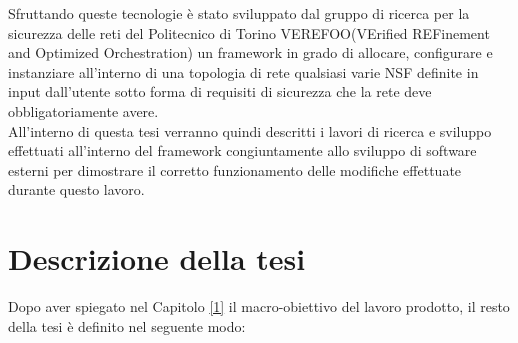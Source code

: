 Sfruttando queste tecnologie è stato sviluppato dal gruppo di ricerca per la sicurezza delle reti del Politecnico di Torino VEREFOO(VErified REFinement and Optimized Orchestration) 
un framework in grado di allocare, configurare e instanziare all'interno di una topologia di rete qualsiasi varie NSF definite in input dall'utente sotto forma di requisiti di sicurezza che la rete deve 
obbligatoriamente avere.\\
All'interno di questa tesi verranno quindi descritti i lavori di ricerca e sviluppo effettuati all'interno del framework congiuntamente allo sviluppo di software esterni per dimostrare il corretto funzionamento delle modifiche effettuate durante questo lavoro.

\section{Descrizione della tesi}

Dopo aver spiegato nel Capitolo \hyperref[ch:intro]{[1]} il macro-obiettivo del lavoro prodotto, il resto della
tesi è definito nel seguente modo:


